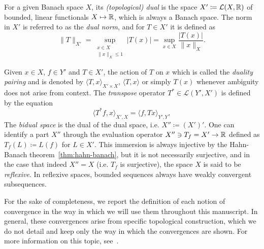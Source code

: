 \begin{definition}
    For a given Banach space $X$, its \emph{(topological) dual} is the space $X'\coloneqq \mathcal{L}(X,\mathbb{R})$ of bounded, linear functionals $X\mapsto \mathbb{R}$, which is always a Banach space. The norm in $X'$ is referred to as the \emph{dual norm}, and for $T\in X'$ it is defined as 
    \begin{equation}\label{eq:dual-norm}
        \|T\|_{X'} = \sup_{\substack{x\in X\\ \|x\|_X\leq 1}} |T(x)|= \sup_{x\in X}\frac{|T(x)|}{\|x\|_X}.
    \end{equation}
\end{definition}
\begin{definition}
    Given $x\in X$, $f\in Y'$ and $T\in X'$, the action of $T$ on $x$ which is called the \emph{duality pairing} and is denoted by $\langle T, x\rangle_{X'\times X}$, $\langle T, x\rangle$ or simply $T(x)$ whenever ambiguity does not arise from context. The \emph{transpose} operator $T^*\in \mathcal{L}(Y',X')$ is defined by the equation 
    \begin{equation}
        \langle T^* f, x\rangle_{X',X} = \langle f, Tx\rangle_{Y',Y},
    \end{equation}
    The \emph{bidual space} is the dual of the dual space, i.e. $X'' \coloneqq (X')'$. One can identify a part $X''$ through the evaluation operator $X''\ni T_f = X'\to \mathbb{R}$ defined as $T_f(L) \coloneqq L(f)$ for $L\in X'$. This immersion is always injective by the Hahn-Banach theorem~\ref{thm:hahn-banach}, but it is not necessarily surjective, and in the case that indeed $X''=X$ (i.e. $T_f$ is surjective), the space $X$ is said to be \emph{reflexive}. In reflexive spaces, bounded sequences always have weakly convergent subsequences. \end{definition}
    For the sake of completeness, we report the definition of each notion of convergence in the way in which we will use them throughout this manuscript. In general, these convergences arise from specific topological construction, which we do not detail and keep only the way in which the convergences are shown. For more information on this topic, see~\cite{BrezisFA}. 
